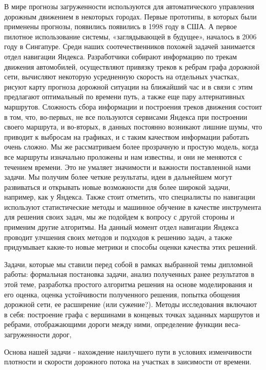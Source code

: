 \documentclass[12pt, a4paper]{article}
\begin{document}
В мире прогнозы загруженности используются для автоматического управления дорожным движением в некоторых городах. Первые прототипы, в которых были применены прогнозы, появились появились в 1998 году в США. А первое пилотное использование системы, «заглядывающей в будущее», началось в 2006 году в Сингапуре. Среди наших соотечественников похожей задачей занимается отдел навигации Яндекса. Разработчики собирают информацию по трекам движения автомобилей, осуществляют привязку треков к ребрам графа дорожной сети, вычисляют некоторую усредненную скорость на отдельных участках, рисуют карту прогноза дорожной ситуации на ближайший час и в связи с этим предлагают оптимальный по времени путь, а также еще пару алтернативных маршрутов. Сложность сбора информации и построения треков движения состоит в том, что, во-первых, не все пользуются сервисами Яндекса при построении своего маршрута, и во-вторых, в данных постоянно возникают лишние шумы, что приводит к выбросам на графиках, и с таким качеством информации работать очень сложно. Мы же рассматриваем более прозрачную и простую модель, когда все маршруты изначально проложены и нам известны, и они не меняются с течением времени. Это не умаляет значимости и важности поставленной нами задачи. Мы получим более четкие результаты, идеи в дальнейшем могут развиваться и открывать новые возможности для более широкой задачи, например, как у Яндекса. Также стоит отметить, что специалисты по навигации используют статистические методы и машинное обучение в качестве инструмента для решения своих задач, мы же подойдем к вопросу с другой стороны и применим другие алгоритмы. На данный момент отдел навигации Яндекса проводит улчшения своих методов и подходов к решению задач, а также придумывает какие-то новые метрики и способы оценки качества этих решений.


Задачи, которые мы ставили перед собой в рамках выбранной темы дипломной работы: формальная постановка задачи, анализ полученных ранее результатов в этой теме, разработка простого алгоритма решения на основе моделирования и его оценка, оценка устойчивости полученного решения, попытка обощения дорожной сети, ее расширение (или сужение?). Методы исследования включают в себя: построение графа с вершинами в концевых точках заданных маршрутов и ребрами, отображающими дороги между ними, определение функции веса-загруженности дорог, 



Основа нашей задачи - нахождение наилучшего пути в условиях изменчивости плотности и скорости дорожного потока на участках в заисимости от времени.
\end{document}
